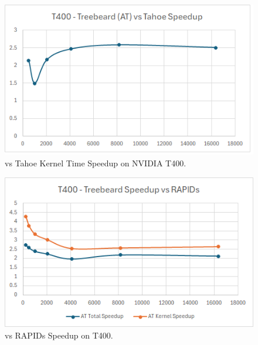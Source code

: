 \begin{figure}[htb]
  \centering
  \includegraphics[width=\linewidth]{figures/TBvsTahoe_T400_KernelTimeSpeedup.png}
  \caption{\Treebeard{} vs Tahoe Kernel Time Speedup on NVIDIA T400.}
  \label{Fig:TBvsTahoe_4060_KernelTimeSpeedup}
\end{figure}

\begin{figure}[htb]
  \centering
  \includegraphics[width=\linewidth]{figures/TBvsRAPIDs_AllBatchSizes_T400.png}
  \caption{\Treebeard{} vs RAPIDs Speedup on T400.}
  \label{Fig:TBvsRAPIDs_AllBatchSizes_T400}
\end{figure}

